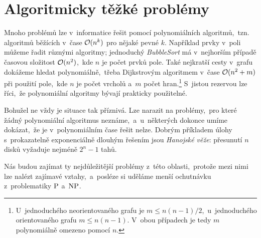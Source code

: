 \chapter{Algoritmicky těžké problémy}\label{chap:tezke-problemy}

Mnoho problémů lze v~informatice řešit pomocí polynomiálních algoritmů,~tzn. algoritmů běžících v~čase $\mathcal{O}(n^k)$ pro nějaké pevné $k$. Například prvky v~poli můžeme řadit různými algoritmy; jednoduchý \emph{BubbleSort} má v~nejhorším případě časovou složitost $\mathcal{O}(n^2)$,~kde $n$ je počet prvků pole. Také nejkratší cesty v~grafu dokážeme hledat polynomiálně,~třeba Dijkstrovým algoritmem v~čase $\mathcal{O}(n^2+m)$ při použití pole,~kde $n$ je počet vrcholů a~$m$ počet hran.\footnote{U~jednoduchého neorientovaného grafu je $m\leqslant n(n-1)/2$,~u~jednoduchého orientovaného grafu $m\leqslant n(n-1)$. V~obou případech je tedy $m$ polynomiálně omezeno pomocí $n$.} S~jistou rezervou lze říci,~že polynomiální algoritmy bývají prakticky použitelné.

Bohužel ne vždy je situace tak příznivá. Lze narazit na problémy,~pro které žádný polynomiální algoritmus neznáme,~a~u~některých dokonce umíme dokázat,~že je v~polynomiálním čase řešit nelze. Dobrým příkladem úlohy s~prokazatelně exponenciálně dlouhým řešením jsou \emph{Hanojské věže}: přesunutí $n$ disků vyžaduje nejméně $2^n-1$ tahů.

Nás budou zajímat ty nejdůležitější problémy z~této oblasti,~protože mezi nimi lze nalézt zajímavé vztahy,~a~posléze si uděláme menší ochutnávku z~problematiky \ensuremath{\classP} a~\ensuremath{\classNP}.








